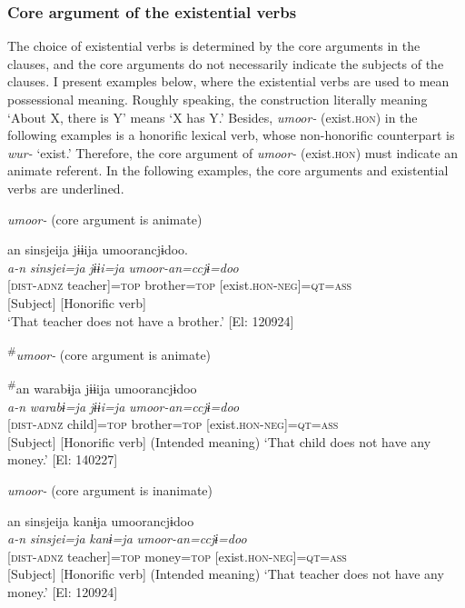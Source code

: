\subsubsection{Core argument of the existential verbs}

The choice of existential verbs is determined by the core arguments in the clauses, and the core arguments do not necessarily indicate the subjects of the clauses. I present examples below, where the existential verbs are used to mean possessional meaning. Roughly speaking, the construction literally meaning ‘About X, there is Y’ means ‘X has Y.’ Besides, \textit{umoor-} (exist.\textsc{hon}) in the following examples is a honorific lexical verb, whose non-honorific counterpart is \textit{wur-} ‘exist.’ Therefore, the core argument of \textit{umoor-} (exist.\textsc{hon}) must indicate an animate referent. In the following examples, the core arguments and existential verbs are underlined.

\ea\label{ex:8-35}
\ea \textit{umoor-} (core argument is animate)

{\TM}
\gllll  an  sinsjeija  jɨɨija  umoorancjɨdoo.\\
\textit{a-n}  \textit{sinsjei=ja}  \textit{jɨɨi=ja}  \textit{umoor-an=ccjɨ=doo}\\
{}[\textsc{dist}-\textsc{adnz}  teacher]=\textsc{top}  brother=\textsc{top}  [exist.\textsc{hon}-\textsc{neg}]=\textsc{qt}=\textsc{ass}\\
      {}[Subject]      [Honorific verb]\\
\glt ‘That teacher does not have a brother.’ [El: 120924]

\ex \textsuperscript{\#}\textit{umoor-} (core argument is animate)

{\TM}
\gllll  \textsuperscript{\#}an  warabɨja  jɨɨija  umoorancjɨdoo\\
\textit{a-n}  \textit{warabɨ=ja}  \textit{jɨɨi=ja}  \textit{umoor-an=ccjɨ=doo}\\
{}[\textsc{dist}-\textsc{adnz}  child]=\textsc{top}  brother=\textsc{top}  [exist.\textsc{hon}-\textsc{neg}]=\textsc{qt}=\textsc{ass}\\
      {}[Subject]      [Honorific verb]
\glt      (Intended meaning) ‘That child does not have any money.’ [El: 140227]

\ex *\textit{umoor-} (core argument is inanimate)

{\TM}
\gllll  *an  sinsjeija  kanɨja  umoorancjɨdoo\\
\textit{a-n}  \textit{sinsjei=ja}  \textit{kanɨ=ja}  \textit{umoor-an=ccjɨ=doo}\\
{}[\textsc{dist}-\textsc{adnz}  teacher]=\textsc{top}  money=\textsc{top}  [exist.\textsc{hon}-\textsc{neg}]=\textsc{qt}=\textsc{ass}\\
      {}[Subject]      [Honorific verb]
\glt       (Intended meaning) ‘That teacher does not have any money.’ [El: 120924]

